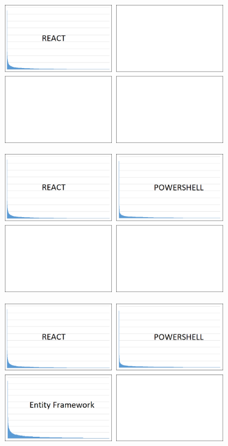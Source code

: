 \documentclass{beamer}
\begin{document}
\begin{frame}{}
\begin{center}
  	\includegraphics[height=6cm]{git_log2.png}
\end{center}
\end{frame}

\begin{frame}{}
\begin{center}
  	\includegraphics[height=6cm]{git_log3.png}
\end{center}
\end{frame}

\begin{frame}{}
\begin{center}
  	\includegraphics[height=6cm]{git_log4.png}
\end{center}
\end{frame}
\end{document}
